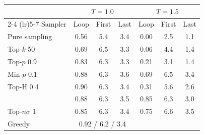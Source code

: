 \begin{tabular}{lcccccc}
\toprule
 & \multicolumn{3}{c}{$T{=}1.0$} & \multicolumn{3}{c}{$T{=}1.5$} \\
\cmidrule(lr){2-4} \cmidrule(lr){5-7}
Sampler & Loop & First & Last & Loop & First & Last \\
\midrule
Pure sampling & 0.56 & 5.4 & 3.4 & 0.00 & 2.5 & 1.1 \\
Top-$k$ 50 & 0.69 & 6.5 & 3.3 & 0.06 & 4.4 & 1.4 \\
Top-$p$ 0.9 & 0.83 & 6.3 & 3.3 & 0.21 & 3.1 & 1.4 \\
Min-$p$ 0.1 & 0.88 & 6.3 & 3.6 & 0.69 & 6.5 & 3.4 \\
Top-H 0.4 & 0.90 & 6.3 & 3.4 & 0.31 & 5.6 & 2.6 \\
\pless{} & 0.88 & 6.3 & 3.5 & 0.85 & 6.3 & 3.0 \\
Top-$n\sigma$ 1 & 0.85 & 6.3 & 3.4 & 0.75 & 6.6 & 3.5 \\
\midrule
Greedy & \multicolumn{3}{c}{0.92 / 6.2 / 3.4} &  &  &  \\
\bottomrule
\end{tabular}
